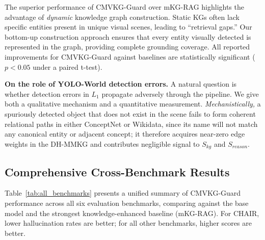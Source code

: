 The superior performance of CMVKG-Guard over mKG-RAG highlights the advantage of \textit{dynamic} knowledge graph construction. Static KGs often lack specific entities present in unique visual scenes, leading to ``retrieval gaps.'' Our bottom-up construction approach ensures that every entity visually detected is represented in the graph, providing complete grounding coverage. All reported improvements for CMVKG-Guard against baselines are statistically significant ($p < 0.05$ under a paired t-test).

\noindent\textbf{On the role of YOLO-World detection errors.} A natural question is whether detection errors in $L_1$ propagate adversely through the pipeline. We give both a qualitative mechanism and a quantitative measurement. \emph{Mechanistically,} a spuriously detected object that does not exist in the scene fails to form coherent relational paths in either ConceptNet or Wikidata, since its name will not match any canonical entity or adjacent concept; it therefore acquires near-zero edge weights in the DH-MMKG and contributes negligible signal to $S_{kg}$ and $S_{reason}$. 

\subsection{Comprehensive Cross-Benchmark Results}

Table~\ref{tab:all_benchmarks} presents a unified summary of CMVKG-Guard performance across all six evaluation benchmarks, comparing against the base model and the strongest knowledge-enhanced baseline (mKG-RAG). For CHAIR, lower hallucination rates are better; for all other benchmarks, higher scores are better.

